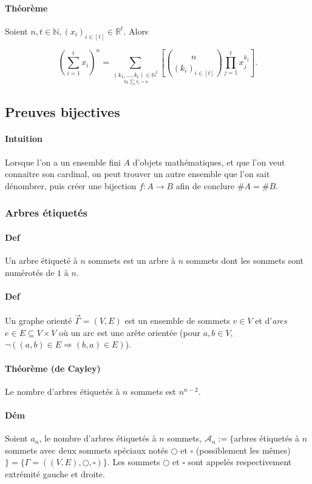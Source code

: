 \documentclass{article}
\DeclareMathOperator{\tq}{\text{ tq }}
\begin{document}
			\paragraph{Théorème} Soient $n, t \in \mathbb N, (x_i)_{i\in[t]} \in \mathbb R^t$. Alors

			\[\left(\sum_{i=1}^tx_i\right)^n
			= \sum_{\underset {\tq \sum_ik_i=n}{(k_1, \ldots, k_t) \in \mathbb N^t}}\left[\binom {n}{(k_i)_{i \in [t]}} \prod_{j=1}^tx_j^{k_j}\right].\]

		\subsection{Preuves bijectives}
			
			\paragraph{Intuition} Lorsque l'on a un ensemble fini $A$ d'objets mathématiques, et que l'on veut connaitre son cardinal, on peut trouver un autre
			ensemble que l'on sait dénombrer, puis créer une bijection $f : A \to B$ afin de conclure $\#A = \#B$.

			\subsubsection{Arbres étiquetés}

			\paragraph{Def} Un arbre étiqueté à $n$ sommets est un arbre à $n$ sommets dont les sommets sont numérotés de $1$ à $n$.

			\paragraph{Def} Un graphe orienté $\vec {\Gamma}= (V, E)$ est un ensemble de sommets $v \in V$ et d'\textit{arcs} $e \in E \subseteq V \times V$
			où un arc est une arête orientée (pour $a, b \in V$, $\lnot((a, b) \in E \Rightarrow (b, a) \in E)$).

			\paragraph{Théorème (de Cayley)} Le nombre d'arbres étiquetés à $n$ sommets est $n^{n-2}$.

			\paragraph{Dém} Soient $a_n$, le nombre d'arbres étiquetés à $n$ sommets, $\mathcal A_n := \{$arbres étiquetés à $n$ sommets avec deux sommets spéciaux notés
			$\bigcirc$ et $\square$ (possiblement les mêmes)$\} = \{\Gamma = ((V, E), \bigcirc, \square)\}$. Les sommets $\bigcirc$ et $\square$ sont appelés respectivement
			extrémité gauche et droite.
\end{document}
